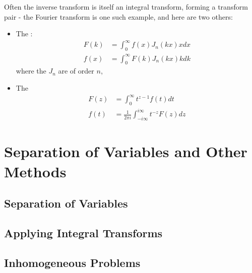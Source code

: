 \documentclass[12pt, a4paper, oneside, openright, titlepage]{book}
\begin{document}
Often the inverse transform is itself an integral transform, forming a transform pair - the Fourier transform is one such example, and here are two others: \begin{itemize}
    \item The : \begin{align*}
            F(k) &= \int_0^{\infty}f(x)J_n(kx)xdx \\
            f(x) &= \int_0^{\infty}F(k)J_n(kx)kdk
    \end{align*}
        where the $J_n$ are  of order $n$,
    \item The  \begin{align*}
            F(z) &= \int_0^{\infty}t^{z-1}f(t)dt \\
            f(t) &= \frac{1}{2\pi i}\int_{-i\infty}^{i\infty}t^{-z}F(z)dz
    \end{align*}
\end{itemize}










\chapter{Separation of Variables and Other Methods}


\section{Separation of Variables}



\section{Applying Integral Transforms}



\section{Inhomogeneous Problems}






\begin{appendices}


\end{appendices}
\end{document}
